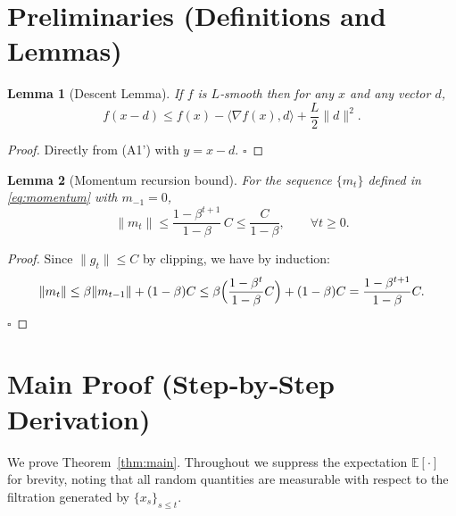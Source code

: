 \documentclass{article}
\newtheorem{lemma}{Lemma}
\begin{document}
\section*{Preliminaries (Definitions and Lemmas)}
\begin{lemma}[Descent Lemma]\label{lem:descent}
If $f$ is $L$‑smooth then for any $x$ and any vector $d$,
\[
f(x-d)\le f(x)-\langle\nabla f(x),d\rangle+\frac{L}{2}\|d\|^2 .
\]
\end{lemma}
\begin{proof}
Directly from (A1') with $y=x-d$. \hfill $\square$
\end{proof}

\begin{lemma}[Momentum recursion bound]\label{lem:momentum}
For the sequence $\{m_t\}$ defined in \eqref{eq:momentum} with $m_{-1}=0$,
\[
\|m_t\|\le \frac{1-\beta^{t+1}}{1-\beta}\,C\le\frac{C}{1-\beta},\qquad\forall t\ge0 .
\]
\end{lemma}
\begin{proof}
Since $\|g_t\|\le C$ by clipping, we have by induction:
\[
\|m_t\|\le\beta\|m_{t-1}\|+(1-\beta)C
\le\beta\Bigl(\frac{1-\beta^{t}}{1-\beta}C\Bigr)+(1-\beta)C
=\frac{1-\beta^{t+1}}{1-\beta}C .
\] \hfill $\square$
\end{proof}

\section*{Main Proof (Step‑by‑Step Derivation)}
We prove Theorem~\ref{thm:main}. Throughout we suppress the expectation $\mathbb{E}[\cdot]$ for brevity, noting that all random quantities are measurable with respect to the filtration generated by $\{x_s\}_{s\le t}$.
\end{document}
